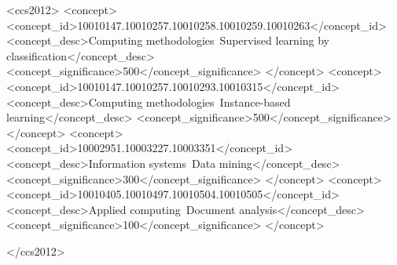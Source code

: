 \documentclass[sigconf]{acmart}
\begin{document}
\begin{CCSXML}
<ccs2012>
   <concept>
       <concept_id>10010147.10010257.10010258.10010259.10010263</concept_id>
       <concept_desc>Computing methodologies~Supervised learning by classification</concept_desc>
       <concept_significance>500</concept_significance>
    </concept>
   <concept>
       <concept_id>10010147.10010257.10010293.10010315</concept_id>
       <concept_desc>Computing methodologies~Instance-based learning</concept_desc>
       <concept_significance>500</concept_significance>
    </concept>
    <concept>
       <concept_id>10002951.10003227.10003351</concept_id>
       <concept_desc>Information systems~Data mining</concept_desc>
       <concept_significance>300</concept_significance>
    </concept>
   <concept>
       <concept_id>10010405.10010497.10010504.10010505</concept_id>
       <concept_desc>Applied computing~Document analysis</concept_desc>
       <concept_significance>100</concept_significance>
       </concept>

 </ccs2012>
\end{CCSXML}




\maketitle




{}

\end{document}
